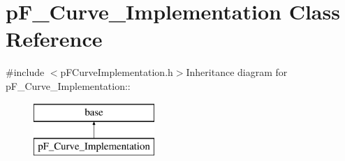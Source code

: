 \hypertarget{classp_f___curve___implementation}{
\section{pF\_\-Curve\_\-Implementation Class Reference}
\label{classp_f___curve___implementation}
}


{\ttfamily \#include $<$pFCurveImplementation.h$>$}Inheritance diagram for pF\_\-Curve\_\-Implementation::\begin{figure}[H]
\begin{center}
\leavevmode
\includegraphics[height=2cm]{classp_f___curve___implementation}
\end{center}
\end{figure}
